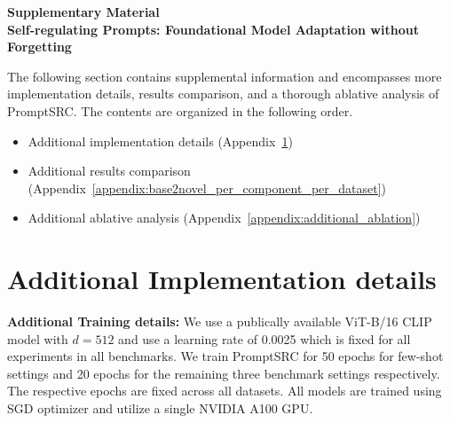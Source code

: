 \documentclass[10pt,twocolumn,letterpaper]{article}
\begin{document}
{\small


}

\newpage

\appendix





\begin{center}
\textbf{{\Large Supplementary Material}\\[0.5em]
{\large Self-regulating Prompts: Foundational Model Adaptation without Forgetting}
}
\end{center}\vspace{1em}

The following section contains supplemental information and encompasses more implementation details, results comparison, and a thorough ablative analysis of PromptSRC. The contents are organized in the following order.
\begin{itemize}
    \item Additional implementation details (Appendix~\ref{appendix:additional_implementation_details})
    \item Additional results comparison (Appendix~\ref{appendix:base2novel_per_component_per_dataset})
    \item Additional ablative analysis (Appendix~\ref{appendix:additional_ablation})
\end{itemize}


\section{Additional Implementation details}
\label{appendix:additional_implementation_details}
\noindent \textbf{{Additional Training details:}} We use a publically available ViT-B/16 CLIP model with $d=512$ and use a learning rate of 0.0025 which is fixed for all experiments in all benchmarks. We train PromptSRC for 50 epochs for few-shot settings and 20 epochs for the remaining three benchmark settings respectively. The respective epochs are fixed across all datasets. All models are trained using SGD optimizer and utilize a single NVIDIA A100 GPU. 
\end{document}
